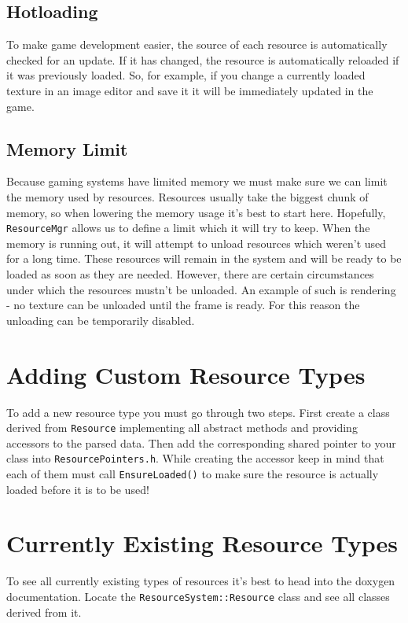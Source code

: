 \subsection{Hotloading}
To make game development easier, the source of each resource is automatically checked for an update. If it has changed, the resource is automatically reloaded if it was previously loaded. So, for example, if you change a currently loaded texture in an image editor and save it it will be immediately updated in the game.

\subsection{Memory Limit}
Because gaming systems have limited memory we must make sure we can limit the memory used by resources. Resources usually take the biggest chunk of memory, so when lowering the memory usage it's best to start here. Hopefully, \verb'ResourceMgr' allows us to define a limit which it will try to keep. When the memory is running out, it will attempt to unload resources which weren't used for a long time. These resources will remain in the system and will be ready to be loaded as soon as they are needed. However, there are certain circumstances under which the resources mustn't be unloaded. An example of such is rendering - no texture can be unloaded until the frame is ready. For this reason the unloading can be temporarily disabled.


\section{Adding Custom Resource Types}
To add a new resource type you must go through two steps. First create a class derived from \verb'Resource' implementing all abstract methods and providing accessors to the parsed data. Then add the corresponding shared pointer to your class into \verb'ResourcePointers.h'. While creating the accessor keep in mind that each of them must call \verb'EnsureLoaded()' to make sure the resource is actually loaded before it is to be used!


\section{Currently Existing Resource Types}
To see all currently existing types of resources it's best to head into the doxygen documentation. Locate the \verb'ResourceSystem::Resource' class and see all classes derived from it.


